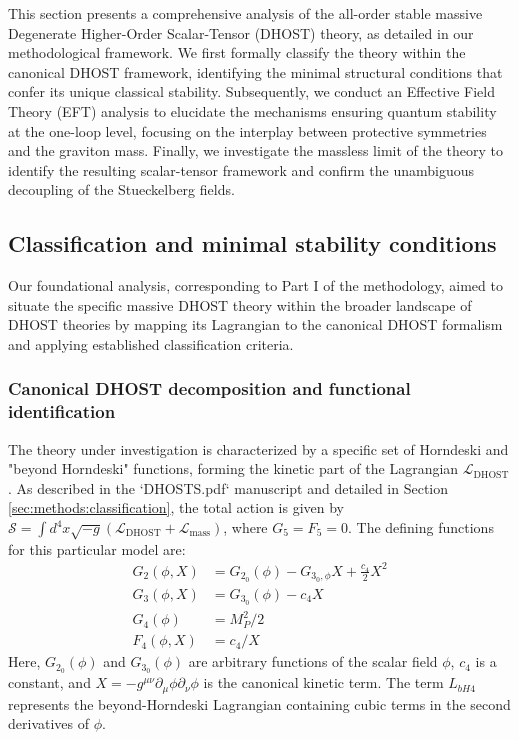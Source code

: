 \documentclass[twocolumn]{aastex631}
\begin{document}
This section presents a comprehensive analysis of the all-order stable massive Degenerate Higher-Order Scalar-Tensor (DHOST) theory, as detailed in our methodological framework. We first formally classify the theory within the canonical DHOST framework, identifying the minimal structural conditions that confer its unique classical stability. Subsequently, we conduct an Effective Field Theory (EFT) analysis to elucidate the mechanisms ensuring quantum stability at the one-loop level, focusing on the interplay between protective symmetries and the graviton mass. Finally, we investigate the massless limit of the theory to identify the resulting scalar-tensor framework and confirm the unambiguous decoupling of the Stueckelberg fields.

\subsection{Classification and minimal stability conditions}
Our foundational analysis, corresponding to Part I of the methodology, aimed to situate the specific massive DHOST theory within the broader landscape of DHOST theories by mapping its Lagrangian to the canonical DHOST formalism and applying established classification criteria.

\subsubsection{Canonical DHOST decomposition and functional identification}
The theory under investigation is characterized by a specific set of Horndeski and "beyond Horndeski" functions, forming the kinetic part of the Lagrangian $\mathcal{L}_{\text{DHOST}}$. As described in the `DHOSTS.pdf` manuscript and detailed in Section \ref{sec:methods:classification}, the total action is given by $\mathcal{S} = \int d^4x \sqrt{-g} (\mathcal{L}_{\text{DHOST}} + \mathcal{L}_{\text{mass}})$, where $G_5=F_5=0$. The defining functions for this particular model are:
\begin{align*}
G_2(\phi, X) &= G_{2_0}(\phi) - G_{3_0,\phi} X + \frac{c_4}{2} X^2 \\
G_3(\phi, X) &= G_{3_0}(\phi) - c_4 X \\
G_4(\phi) &= M_P^2 / 2 \\
F_4(\phi, X) &= c_4 / X
\end{align*}
Here, $G_{2_0}(\phi)$ and $G_{3_0}(\phi)$ are arbitrary functions of the scalar field $\phi$, $c_4$ is a constant, and $X = -g^{\mu\nu}\partial_\mu\phi\partial_\nu\phi$ is the canonical kinetic term. The term $L_{bH4}$ represents the beyond-Horndeski Lagrangian containing cubic terms in the second derivatives of $\phi$.
\end{document}
